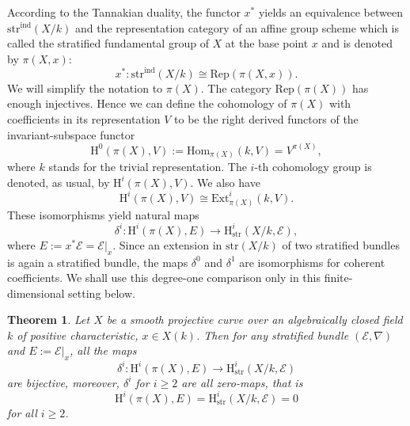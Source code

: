 \documentclass[12pt,a4]{amsart}
\newtheorem{thm}[claim]{Theorem}
\theoremstyle{definition}
\begin{document}
According to the Tannakian duality, the functor $x^*$
yields an equivalence between $\mathrm{str}^\mathrm{ind}(X/k)$ 
and the representation category of an affine group scheme which is called the
stratified fundamental group of $X$ at the base point $x$ and is denoted
by $\pi(X,x)$:
$$x^*: \mathrm{str}^\mathrm{ind}(X/k) \cong \mathrm{Rep}(\pi(X,x)).$$
We will simplify the notation to $\pi(X)$. 
The category  $\mathrm{Rep}(\pi(X))$ has enough injectives. Hence
we can define the cohomology of $\pi(X)$ with coefficients in its representation $V$ to be
the right derived functors of the invariant-subspace functor
$$\mathrm{H}^0(\pi(X),V):=\mathrm{Hom}_{\pi(X)}
(k,V)=V^{\pi(X)},$$
where $k$ stands for the trivial representation. The $i$-th cohomology
group is denoted, as usual, by $\mathrm{H}^i(\pi(X),V)$.
We also have
$$\mathrm{H}^i(\pi(X),V)\cong \mathrm{Ext}^i_{\pi(X)}(k,V).$$
These isomorphisms yield natural maps
$$\delta^i: \mathrm{H}^i(\pi(X),E)\longrightarrow 
\mathrm{H}^i_\text{str}(X/k,\mathcal E),$$
where $E:=x^*\mathcal E=\mathcal E|_x.$ 
Since an extension in $\mathrm{str}(X/k)$ of two stratified bundles is again a stratified bundle, the maps $\delta^0$ and $\delta^1$ are isomorphisms for coherent coefficients. We shall use this degree-one comparison only in this finite-dimensional setting below.


\begin{thm}\label{thm_delta_stratified}
Let $X$ be a smooth projective curve over an algebraically closed
field $k$ of positive characteristic, $x\in X(k)$. Then for any stratified bundle 
$(\mathcal E,\nabla)$ and $E:=\mathcal E|_x$, all the maps
$$\delta^i: \mathrm{H}^i(\pi(X),E)\longrightarrow 
\mathrm{H}^i_\mathrm{str}(X/k,\mathcal E)$$
are bijective, moreover, $\delta^i$ for $i\geq 2$ are all zero-maps, that is
$$\mathrm{H}^i(\pi(X),E)=
\mathrm{H}^i_\mathrm{str}(X/k,\mathcal E)=0$$
for all $i\geq 2$. 
\end{thm}
\end{document}
